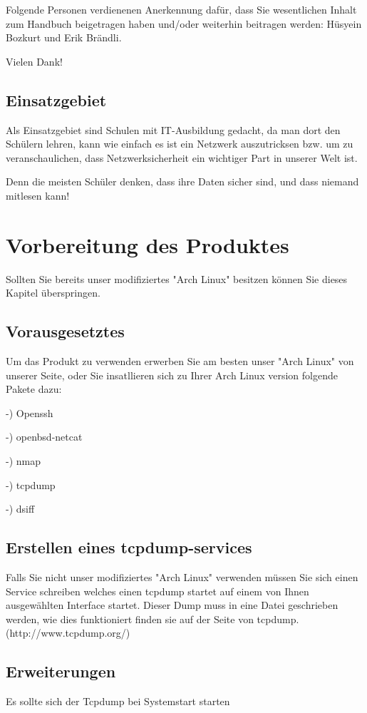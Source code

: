 \documentclass[11pt]{article} %
\begin{document}
Folgende Personen verdienenen Anerkennung dafür, dass Sie wesentlichen Inhalt zum Handbuch beigetragen haben und/oder weiterhin beitragen werden: Hüsyein Bozkurt und Erik Brändli.

Vielen Dank!

\subsection{Einsatzgebiet}

Als Einsatzgebiet sind Schulen mit IT-Ausbildung gedacht, da man dort den Schülern lehren, kann wie einfach es ist ein Netzwerk auszutricksen bzw. um zu veranschaulichen, dass Netzwerksicherheit ein wichtiger Part in unserer Welt ist.

Denn die meisten Schüler denken, dass ihre Daten sicher sind, und dass niemand mitlesen kann!

\section{Vorbereitung des Produktes}
Sollten Sie bereits unser modifiziertes "Arch Linux" besitzen können Sie dieses Kapitel überspringen.
\subsection{Vorausgesetztes}
Um das Produkt zu verwenden erwerben Sie am besten unser "Arch Linux" von unserer Seite, oder Sie insatllieren sich zu Ihrer Arch Linux version folgende Pakete dazu:

-) Openssh

-) openbsd-netcat

-) nmap

-) tcpdump

-) dsiff

\subsection{Erstellen eines tcpdump-services}
Falls Sie nicht unser modifiziertes "Arch Linux" verwenden müssen Sie sich einen Service schreiben welches einen tcpdump startet auf einem von Ihnen ausgewählten Interface startet. Dieser Dump muss in eine Datei geschrieben werden, wie dies funktioniert finden sie auf der Seite von tcpdump.(http://www.tcpdump.org/)\\

\subsection{Erweiterungen}
Es sollte sich der Tcpdump bei Systemstart starten
\end{document}
